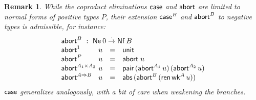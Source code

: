 \documentclass[sigplan,screen,fleqn]{acmart}
\newtheorem{remark}{Remark}
\begin{document}
\begin{remark}
While the coproduct eliminations $\mathsf{case}$ and $\mathsf{abort}$ are limited to
normal forms of positive types $P$, their extension $\mathsf{case}^B$ and
$\mathsf{abort}^B$ to negative types
is admissible, for instance:
\[
\begin{array}{l@{~}lcl}
  \multicolumn 4 l {\tabort^B ~:~ \tNe\, 0 \todot \tNf\,B} \\
  \tabort^{\tyone}     & u & = & \tunit \\
  \tabort^P           & u & = & \tabort\;u \\
  \tabort^{A_1 \times A_2} & u & = & \tpair\,(\tabort^{A_1}\,u)\,(\tabort^{A_2}\,u) \\
  \tabort^{A \To B}    & u & = & \tabs\,(\tabort^B\,(\tren\,\twk^A\,u)) \\
\end{array}
\]
$\mathsf{case}$ generalizes analogously, with a bit of care when weakening
the branches.
\end{remark}




\end{document}
